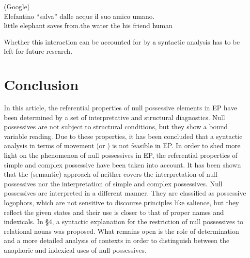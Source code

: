 \documentclass[output=paper]{langsci/langscibook}
\begin{document}
\ea%
          (Google) \label{ex:wein:53}\\
    \gll Elefantino “salva” dalle acque il suo amico umano.\\
         {little elephant} saves from.the water the his friend human\\
\z

\ea%
    \label{ex:wein:54}
    \z
\z

Whether this interaction can be accounted for by a syntactic analysis has to be left for future research.

\section{Conclusion}%
In this article, the referential properties of null possessive elements in EP have been determined by a set of interpretative and structural diagnostics. Null possessives are not subject to structural conditions, but they show a bound variable reading. Due to these properties, it has been concluded that a syntactic analysis in terms of movement (or ) is not feasible in EP. In order to shed more light on the phenomenon of null possessives in EP, the referential properties of simple and complex possessive have been taken into account. It has been shown that the (semantic) approach of \citet{Reinhart2006} neither covers the interpretation of null possessives nor the interpretation of simple and complex possessives. Null possessives are interpreted in a different manner. They are classified as possessive logophors, which are not sensitive to discourse principles like salience, but they reflect the given states and their use is closer to that of proper names and indexicals. In §4, a syntactic explanation for the restriction of null possessives to relational nouns was proposed. What remains open is the role of determination and a more detailed analysis of contexts in order to distinguish between the anaphoric and indexical uses of null possessives.
 
{\sloppy\printbibliography[heading=subbibliography,notkeyword=this]}
\end{document}

